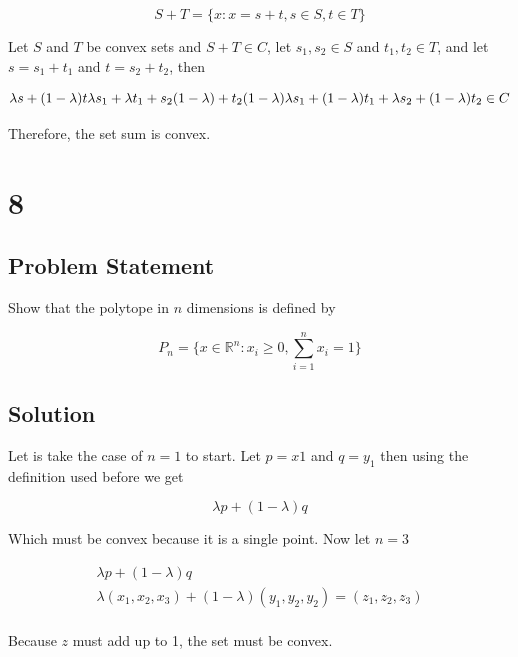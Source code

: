 \documentclass[11pt,a4paper,final]{article}
\begin{document}
$$
S+T = \{x: x = s + t, s\in S, t \in T\}
$$

Let \(S\) and \(T\) be convex sets and \(S+T \in C\), let \(s_1, s_2 \in S\) and \(t_1, t_2 \in T\), and let \(s = s_1 + t_1\) and \(t = s_2 + t_2\), then

\begin{equation*}
\lambda s + (1 - \lambda)t \\
\lambda s_1 + \lambda t_1 + s_2(1-\lambda) + t_2(1-\lambda) \\
\lambda s_1 + (1-\lambda)t_1 + \lambda s_2 + (1-\lambda) t_2 \in C \\
\end{equation*}

Therefore, the set sum is convex.

\section{8}
\label{sec:1.8}
\subsection{Problem Statement}
\label{sec:org61070b3}
Show that the polytope in \(n\) dimensions is defined by

\begin{equation*}
P_n = \{ x \in \mathbb{R}^n : x_i \ge 0, \sum_{i=1}^n x_i = 1 \}
\end{equation*}

\subsection{Solution}
\label{sec:org38da342}
Let is take the case of \(n=1\) to start. Let \(p = x1\) and \(q = y_1\) then
using the definition used before we get

$$
\lambda p + (1 - \lambda)q
$$

Which must be convex because it is a single point. Now let \(n=3\)

\begin{equation*}
\begin{array}{c}
\lambda p + (1 - \lambda)q \\
\lambda (x_1, x_2, x_3) + (1 - \lambda)(y_1, y_2, y_2) = (z_1, z_2, z_3)\\
\end{array}
\end{equation*}

Because \(z\) must add up to 1, the set must be convex.
\end{document}

